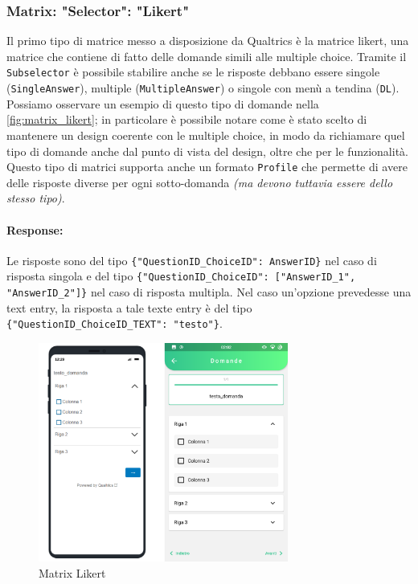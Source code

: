 \subsubsection{Matrix: "Selector": "Likert"}
Il primo tipo di matrice messo a disposizione da Qualtrics è la matrice likert, una matrice che contiene di fatto delle domande simili alle multiple choice. Tramite il \texttt{Subselector} è possibile stabilire anche se le risposte debbano essere singole (\texttt{SingleAnswer}), multiple (\texttt{MultipleAnswer}) o singole con menù a tendina (\texttt{DL}). Possiamo osservare un esempio di questo tipo di domande nella \autoref{fig:matrix_likert}; in particolare è possibile notare come è stato scelto di mantenere un design coerente con le multiple choice, in modo da richiamare quel tipo di domande anche dal punto di vista del design, oltre che per le funzionalità. Questo tipo di matrici supporta anche un formato \texttt{Profile} che permette di avere delle risposte diverse per ogni sotto-domanda \textit{(ma devono tuttavia essere dello stesso tipo)}.

\paragraph{Response:}
Le risposte sono del tipo \texttt{\{"QuestionID\_ChoiceID": AnswerID\}} nel caso di risposta singola e del tipo \texttt{\{"QuestionID\_ChoiceID": ["AnswerID\_1", "AnswerID\_2"]\}} nel caso di risposta multipla. Nel caso un'opzione prevedesse una text entry, la risposta a tale texte entry è del tipo \texttt{\{"QuestionID\_ChoiceID\_TEXT": "testo"\}}.

\begin{figure}[h!]
\centering
\includegraphics[width=0.73\textwidth]{img/matrix_likert}
\caption{Matrix Likert}
\label{fig:matrix_likert}
\end{figure}

